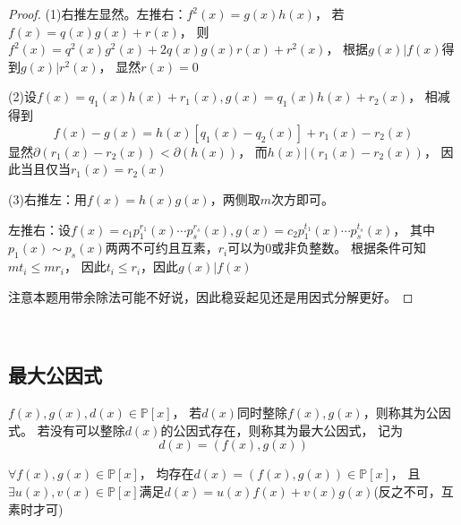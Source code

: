 \begin{proof}
  (1)右推左显然。左推右：$f^2(x) = g(x)h(x)$，
  若$f(x) = q(x) g(x) + r(x)$，
  则$f^2(x) = q^2(x)g^2(x) + 2q(x)g(x)r(x) + r^2(x)$，
  根据$g(x)|f(x)$得到$g(x)|r^2(x)$，
  显然$r(x) = 0$

  (2)设$f(x) = q_1(x)h(x)+r_1(x), g(x) = q_1(x)h(x) + r_2(x)$，
  相减得到
  \begin{equation*}
    f(x) - g(x) = h(x)[q_1(x) - q_2(x)] + r_1(x) - r_2(x)
  \end{equation*}
  显然$\partial(r_1(x) - r_2(x)) < \partial(h(x))$，
  而$h(x) |(r_1(x) - r_2(x))$，
  因此当且仅当$r_1(x) = r_2(x)$

  (3)右推左：用$f(x) = h(x)g(x)$，两侧取$m$次方即可。

  左推右：设$f(x) = c_1p_1^{r_1}(x) \cdots p_s^{r_s}(x), g(x) = c_2p_1^{t_1}(x) \cdots p_s^{t_s}(x)$，
  其中$p_1(x) \sim p_s(x)$两两不可约且互素，$r_i$可以为$0$或非负整数。
  根据条件可知$mt_i \leq m r_i$，
  因此$t_i \leq r_i$，因此$g(x) | f(x)$

  注意本题用带余除法可能不好说，因此稳妥起见还是用因式分解更好。
\end{proof}


~


\subsection{最大公因式}

\begin{definition}[最大公因式]
  $f(x),g(x),d(x) \in \mathbb{P}[x]$，
  若$d(x)$同时整除$f(x),g(x)$，则称其为公因式。
  若没有可以整除$d(x)$的公因式存在，则称其为最大公因式，
  记为
  \begin{equation*}
    d(x) = (f(x),g(x))
  \end{equation*}
\end{definition}

\begin{theorem}[最大公因式表示定理]
  $\forall f(x),g(x) \in \mathbb{P}[x]$，
  均存在$d(x) = (f(x),g(x)) \in \mathbb{P}[x]$，
  且$\exists u(x),v(x) \in \mathbb{P}[x]$满足$d(x) = u(x)f(x) + v(x)g(x)$(反之不可，互素时才可)
\end{theorem}

